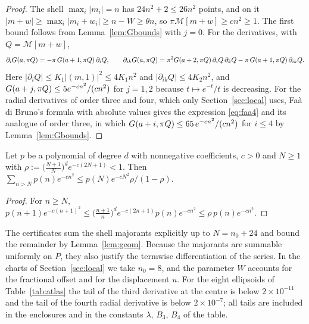 \begin{proof}
The shell $\max_i|m_i|=n$ has $24n^2+2\le26n^2$ points, and on it $|m+w|\ge\max_i|m_i+w_i|\ge n-W\ge\theta n$, so
$\pi\mathcal M[m+w]\ge cn^2\ge1$. The first bound follows from Lemma~\ref{lem:Gbounds} with $j=0$. For the derivatives, with
$Q=\mathcal M[m+w]$,
\[
  \partial_iG(a,\pi Q)=-\pi\,G(a+1,\pi Q)\,\partial_iQ,\qquad
  \partial_{ik}G(a,\pi Q)=\pi^2G(a+2,\pi Q)\,\partial_iQ\,\partial_kQ-\pi\,G(a+1,\pi Q)\,\partial_{ik}Q .
\]
Here $|\partial_iQ|\le K_1|(m,1)|^2\le4K_1n^2$ and $|\partial_{ik}Q|\le4K_2n^2$, and $G(a+j,\pi Q)\le5e^{-cn^2}/(cn^2)$ for $j=1,2$
because $t\mapsto e^{-t}/t$ is decreasing. For the radial derivatives of order three and four, which only Section~\ref{sec:local}
uses, Fa\`a di Bruno's formula with absolute values gives the expression \eqref{eq:faa4} and its analogue of order three, in
which $G(a+i,\pi Q)\le65\,e^{-cn^2}/(cn^2)$ for $i\le4$ by Lemma~\ref{lem:Gbounds}.
\end{proof}

\begin{lemma}[Summation]\label{lem:geom}
Let $p$ be a polynomial of degree $d$ with nonnegative coefficients, $c>0$ and $N\ge1$ with
$\rho:=\bigl(\frac{N+1}N\bigr)^de^{-c(2N+1)}<1$. Then $\sum_{n>N}p(n)e^{-cn^2}\le p(N)e^{-cN^2}\rho/(1-\rho)$.
\end{lemma}

\begin{proof}
For $n\ge N$, $p(n+1)e^{-c(n+1)^2}\le\bigl(\frac{n+1}n\bigr)^de^{-c(2n+1)}p(n)e^{-cn^2}\le\rho\,p(n)e^{-cn^2}$.
\end{proof}

The certificates sum the shell majorants explicitly up to $N=n_0+24$ and bound the remainder by Lemma~\ref{lem:geom}. Because the
majorants are summable uniformly on $P$, they also justify the termwise differentiation of the series. In the charts of
Section~\ref{sec:local} we take $n_0=8$, and the parameter $W$ accounts for the fractional offset and for the displacement $u$. For
the eight ellipsoids of Table~\ref{tab:atlas} the tail of the third derivative at the centre is below $2\times10^{-11}$ and the tail
of the fourth radial derivative is below $2\times10^{-7}$; all tails are included in the enclosures and in the constants $\lambda$,
$B_3$, $B_4$ of the table.
